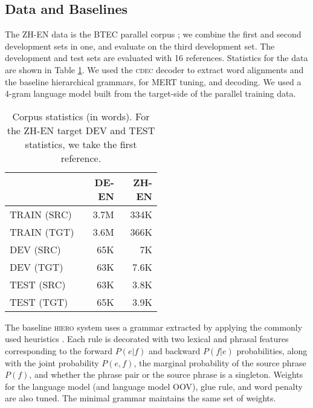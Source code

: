 \documentclass[11pt]{article}
\begin{document}
\subsection{Data and Baselines}
\label{sec:data}
The \textsc{ZH-EN} data is the BTEC parallel corpus \cite{Paul2009}; we combine the first and second development sets in one, and evaluate on the third development set.   
The development and test sets are evaluated with 16 references.  
Statistics for the data are shown in Table \ref{tab:corpusstats}.  
We used the \textsc{cdec} decoder \cite{Dyer2010} to extract word alignments and the baseline hierarchical grammars, for MERT tuning, and decoding.  
We used a 4-gram language model built from the target-side of the parallel training data.  
\begin{table}[h!]
  \begin{center}
    \begin{tabular}{p{0.5\linewidth}rr}
      \hline
      & \textsc{DE-EN} & \textsc{ZH-EN} \\
	  \hline
      TRAIN (SRC) & 3.7M & 334K \\
	  TRAIN (TGT) & 3.6M &  366K \\
	  DEV (SRC) & 65K & 7K \\
      DEV (TGT) & 63K &  7.6K\\
	  TEST (SRC) & 63K &  3.8K \\
	  TEST (TGT) & 65K & 3.9K \\
	\end{tabular}
  \end{center}
  \caption{Corpus statistics (in words).  For the \textsc{ZH-EN} target DEV and TEST statistics, we take the first reference.}
  \label{tab:corpusstats}
\end{table}

The baseline \textsc{hiero} system uses a grammar extracted by applying the commonly used heuristics \cite{Chiang2005}.  
Each rule is decorated with two lexical and phrasal features corresponding to the forward $P(e|f)$ and backward $P(f|e)$ probabilities, along with the joint probability $P(e,f)$, the marginal probability of the source phrase $P(f)$, and whether the phrase pair or the source phrase is a singleton. 
Weights for the language model (and language model OOV), glue rule, and word penalty are also tuned. 
The minimal grammar maintains the same set of weights. 
\end{document}
